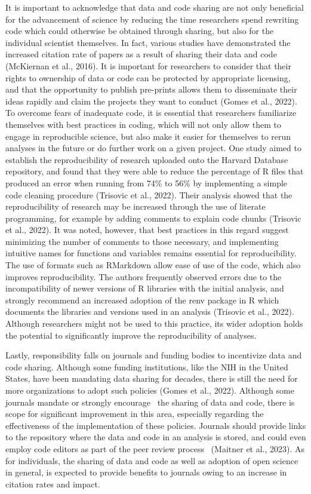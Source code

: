 \documentclass[
]{article}
\begin{document}
It is important to acknowledge that data and code sharing are not only
beneficial for the advancement of science by reducing the time
researchers spend rewriting code which could otherwise be obtained
through sharing, but also for the individual scientist themselves. In
fact, various studies have demonstrated the increased citation rate of
papers as a result of sharing their data and code (McKiernan et al.,
2016). It is important for researchers to consider that their rights to
ownership of data or code can be protected by appropriate licensing, and
that the opportunity to publish pre-prints allows them to disseminate
their ideas rapidly and claim the projects they want to conduct (Gomes
et al., 2022). To overcome fears of inadequate code, it is essential
that researchers familiarize themselves with best practices in coding,
which will not only allow them to engage in reproducible science, but
also make it easier for themselves to rerun analyses in the future or do
further work on a given project. One study aimed to establish the
reproducibility of research uploaded onto the Harvard Database
repository, and found that they were able to reduce the percentage of R
files that produced an error when running from 74\% to 56\% by
implementing a simple code cleaning procedure (Trisovic et al., 2022).
Their analysis showed that the reproducibility of research may be
increased through the use of literate programming, for example by adding
comments to explain code chunks (Trisovic et al., 2022). It was noted,
however, that best practices in this regard suggest minimizing the
number of comments to those necessary, and implementing intuitive names
for functions and variables remains essential for reproducibility. The
use of formats such as RMarkdown allow ease of use of the code, which
also improves reproducibility. The authors frequently observed errors
due to the incompatibility of newer versions of R libraries with the
initial analysis, and strongly recommend an increased adoption of the
renv package in R which documents the libraries and versions used in an
analysis (Trisovic et al., 2022). Although researchers might not be used
to this practice, its wider adoption holds the potential to
significantly improve the reproducibility of analyses.~

Lastly, responsibility falls on journals and funding bodies to
incentivize data and code sharing. Although some funding institutions,
like the NIH in the United States, have been mandating data sharing for
decades, there is still the need for more organizations to adopt such
policies (Gomes et al., 2022). Although some journals mandate or
strongly encourage~ the sharing of data and code, there is scope for
significant improvement in this area, especially regarding the
effectiveness of the implementation of these policies. Journals should
provide links to the repository where the data and code in an analysis
is stored, and could even employ code editors as part of the peer review
process~ (Maitner et al., 2023). As for individuals, the sharing of data
and code as well as adoption of open science in general, is expected to
provide benefits to journals owing to an increase in citation rates and
impact.
\end{document}
